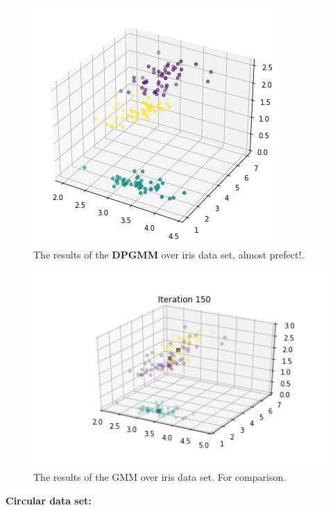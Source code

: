 \documentclass[12pt, a4paper]{paper}
\begin{document}
\begin{figure}[h!]
\centering
\includegraphics[scale=0.4]{DPGMM_iris_1_2_3.png}
\caption{The results of the \textbf{DPGMM} over iris data set, almost prefect!.}
\label{fig:Circular_3}
\end{figure}

\begin{figure}[h!]
\centering
\includegraphics[scale=0.5]{comp_MLE_DPGMM.png}
\caption{The results of the GMM over iris data set. For comparison.}
\label{fig:Circular_3}
\end{figure}

\newpage

\textbf{Circular data set:}
\end{document}
